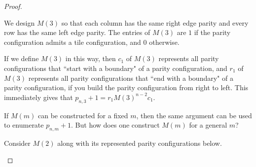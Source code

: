 \documentclass[12pt]{article}
\theoremstyle{plain}
\theoremstyle{definition}
\theoremstyle{remark}
\theoremstyle{definition}
\newcommand{\cell}[4]{ \draw[thick] ( #1 , #2 ) rectangle ( #3 , #4 );}
\newcommand{\lablnode}[3]{\node[shape=circle,draw=none,fill=none, inner sep=0pt,minimum size=0pt] (A) at ( #1 , #2 ) {#3};}
\begin{document}
\begin{proof}
\begin{center}
\end{center}

We design $M(3)$ so that each column has the same right edge parity and every row has the same left edge parity. The entries of $M(3)$ are $1$ if the parity configuration admits a tile configuration, and $0$ otherwise. 

If we define $M(3)$ in this way, then $c_1$ of $M(3)$ represents all parity configurations that ``start with a boundary" of a parity configuration, and $r_1$ of $M(3)$ represents all parity configurations that ``end with a boundary" of a parity configuration, if you build the parity configuration from right to left. This immediately gives that $p_{n,3}+1 = r_1 M(3)^{n-2} c_1.$

If $M(m)$ can be constructed for a fixed $m$, then the same argument can be used to enumerate $p_{n,m}+1$. But how does one construct $M(m)$ for a general $m$?

Consider $M(2)$ along with its represented parity configurations below.

\begin{center}
\end{center}
\end{proof}
\end{document}
